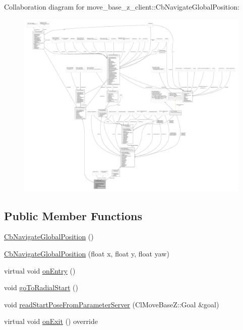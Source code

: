 Collaboration diagram for move\+\_\+base\+\_\+z\+\_\+client\+:\+:Cb\+Navigate\+Global\+Position\+:
\nopagebreak
\begin{figure}[H]
\begin{center}
\leavevmode
\includegraphics[width=350pt]{classmove__base__z__client_1_1CbNavigateGlobalPosition__coll__graph}
\end{center}
\end{figure}
\subsection*{Public Member Functions}
\begin{DoxyCompactItemize}
\item 
\hyperlink{classmove__base__z__client_1_1CbNavigateGlobalPosition_a3aec938912c0df9798bb18d5bb86c628}{Cb\+Navigate\+Global\+Position} ()
\item 
\hyperlink{classmove__base__z__client_1_1CbNavigateGlobalPosition_a4270b60a6d8ea39810ef1133f4e2cae4}{Cb\+Navigate\+Global\+Position} (float x, float y, float yaw)
\item 
virtual void \hyperlink{classmove__base__z__client_1_1CbNavigateGlobalPosition_a79f11334456f350b488f7d9a204ea3c5}{on\+Entry} ()
\item 
void \hyperlink{classmove__base__z__client_1_1CbNavigateGlobalPosition_abc8b9437cce7b86ec7acb07c463c90e5}{go\+To\+Radial\+Start} ()
\item 
void \hyperlink{classmove__base__z__client_1_1CbNavigateGlobalPosition_a866ea02c9e25ac1df9df88272deb04b3}{read\+Start\+Pose\+From\+Parameter\+Server} (Cl\+Move\+Base\+Z\+::\+Goal \&goal)
\item 
virtual void \hyperlink{classmove__base__z__client_1_1CbNavigateGlobalPosition_ac7994a9da6384c1b9ad3826bfebb5f56}{on\+Exit} () override
\end{DoxyCompactItemize}
